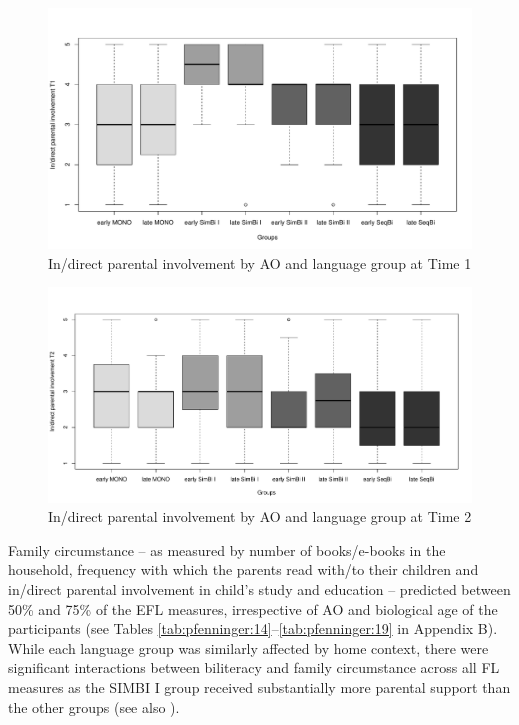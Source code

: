\documentclass[output=paper,modfonts,nonflat,newtxmath]{langsci/langscibook}
\begin{document}
\begin{figure}%
\includegraphics[width=\textwidth]{figures/pfenningerfig1.pdf}
\caption{\label{fig:pfenninger:1} In/direct parental involvement by AO and language group at Time 1}
\end{figure}

\begin{figure}%
\includegraphics[width=\textwidth]{figures/PfenningerFigure2.pdf}
\caption{\label{fig:pfenninger:2} In/direct parental involvement by AO and language group at Time 2}
\end{figure}

Family circumstance – as measured by number of books/e-books in the household, frequency with which the parents read with/to their children and in/direct parental involvement in child’s study and education – predicted between 50\% and 75\% of the EFL measures, irrespective of AO and biological age of the participants (see Tables \ref{tab:pfenninger:14}--\ref{tab:pfenninger:19} in Appendix B). While each language group was similarly affected by home context, there were significant interactions between biliteracy and family circumstance across all FL measures as the SIMBI I group received substantially more parental support than the other groups (see also \citealt{PfenningerSingleton2019}).
\end{document}
